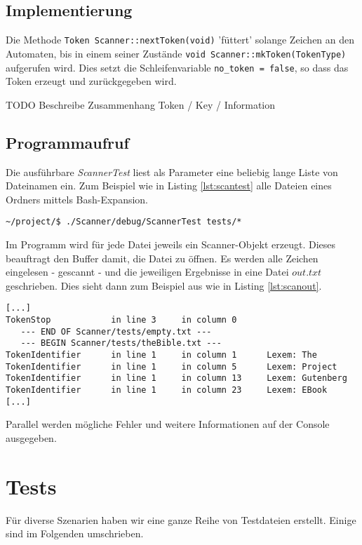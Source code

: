 \documentclass[
a4paper,   %
11pt,      %
oneside,   %
onecolumn, %
final      %
]{article}
\newcommand{\code}[1]{\lstinline$#1$}
\begin{document}
\subsection{Implementierung}
Die Methode \code{Token Scanner::nextToken(void)} 'füttert' solange Zeichen an den Automaten, bis in einem seiner Zustände \code{void Scanner::mkToken(TokenType)} aufgerufen wird.
Dies setzt die Schleifenvariable \code{no_token = false}, so dass das Token erzeugt und zurückgegeben wird.

TODO Beschreibe Zusammenhang Token / Key / Information

\subsection{Programmaufruf}
Die ausführbare \emph{ScannerTest} liest als Parameter eine beliebig lange Liste von Dateinamen ein. Zum Beispiel wie in Listing \ref{lst:scantest} alle Dateien eines Ordners mittels Bash-Expansion.
\begin{lstlisting}[language=PseudoCode, caption={Aufruf von ScannerTest}, label=lst:scantest]
~/project/$ ./Scanner/debug/ScannerTest tests/*
\end{lstlisting}
Im Programm wird für jede Datei jeweils ein Scanner-Objekt erzeugt. Dieses beauftragt den Buffer damit, die Datei zu öffnen. Es werden alle Zeichen eingelesen - gescannt - und die jeweiligen Ergebnisse in eine Datei $out.txt$ geschrieben. Dies sieht dann zum Beispiel aus wie in Listing \ref{lst:scanout}.
\begin{lstlisting}[language=PseudoCode, firstnumber=57, caption={Dateiausgabe von ScannerTest}, label=lst:scanout]
[...]
TokenStop            in line 3     in column 0
   --- END OF Scanner/tests/empty.txt ---
   --- BEGIN Scanner/tests/theBible.txt ---
TokenIdentifier	     in line 1     in column 1      Lexem: The
TokenIdentifier	     in line 1     in column 5      Lexem: Project
TokenIdentifier	     in line 1     in column 13     Lexem: Gutenberg
TokenIdentifier      in line 1     in column 23     Lexem: EBook
[...]
\end{lstlisting}
Parallel werden mögliche Fehler und weitere Informationen auf der Console ausgegeben.




\section{Tests}
Für diverse Szenarien haben wir eine ganze Reihe von Testdateien erstellt. Einige sind im Folgenden umschrieben.
\end{document}
